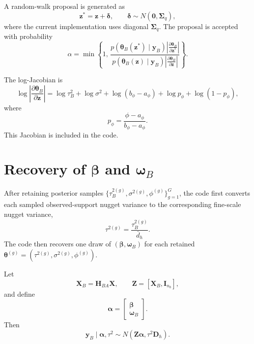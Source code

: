 \documentclass[11pt]{article}
\newcommand{\bsy}{\bm{y}}
\newcommand{\bsb}{\bm{\beta}}
\newcommand{\bsw}{\bm{\omega}}
\newcommand{\bstheta}{\bm{\theta}}
\begin{document}
A random-walk proposal is generated as
\begin{equation}
\bm{z}^{*}
=
\bm{z}
+
\bm{\delta},
\qquad
\bm{\delta}\sim N(\bm{0},\bm{\Sigma}_q),
\label{eq:rw_proposal}
\end{equation}
where the current implementation uses diagonal $\bm{\Sigma}_q$. The proposal is accepted with probability
\begin{equation}
\alpha
=
\min\left\{
1,\,
\frac{
p(\bstheta_B(\bm{z}^{*})\mid \bsy_B)
\left|\frac{\partial \bstheta_B}{\partial \bm{z}^{*}}\right|
}{
p(\bstheta_B(\bm{z})\mid \bsy_B)
\left|\frac{\partial \bstheta_B}{\partial \bm{z}}\right|
}
\right\}.
\label{eq:mh_alpha}
\end{equation}

The log-Jacobian is
\begin{equation}
\log\left|\frac{\partial \bstheta_B}{\partial \bm{z}}\right|
=
\log\tau_B^2
+
\log\sigma^2
+
\log(b_{\phi}-a_{\phi})
+
\log p_{\phi}
+
\log(1-p_{\phi}),
\label{eq:jacobian}
\end{equation}
where
\begin{equation}
p_{\phi}
=
\frac{\phi-a_{\phi}}{b_{\phi}-a_{\phi}}.
\label{eq:p_phi}
\end{equation}
This Jacobian is included in the code.

\section{Recovery of $\bsb$ and $\bsw_B$}

After retaining posterior samples $\{ \tau_B^{2(g)},\sigma^{2(g)},\phi^{(g)} \}_{g=1}^{G}$, the code first converts each sampled observed-support nugget variance to the corresponding fine-scale nugget variance,
$$
\tau^{2(g)} = \frac{\tau_B^{2(g)}}{\bar{d}_h}.
$$
The code then recovers one draw of $(\bsb,\bsw_B)$ for each retained $\bstheta^{(g)}=(\tau^{2(g)},\sigma^{2(g)},\phi^{(g)})$.

Let
\begin{equation}
\bm{X}_B = \bm{H}_{BA}\bm{X},
\qquad
\bm{Z} = [\bm{X}_B,\bm{I}_{n_b}],
\label{eq:Z_def}
\end{equation}
and define
\begin{equation}
\bm{\alpha}
=
\begin{bmatrix}
\bsb\\
\bsw_B
\end{bmatrix}.
\label{eq:alpha_def}
\end{equation}
Then
\begin{equation}
\bsy_B \mid \bm{\alpha},\tau^2
\sim
N(\bm{Z}\bm{\alpha},\tau^2\bm{D}_h).
\label{eq:yB_alpha}
\end{equation}
\end{document}
